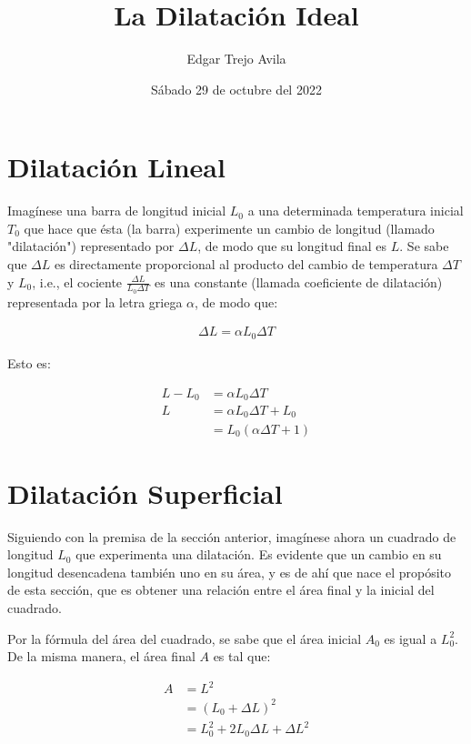 \documentclass{article}
\title{La Dilatación Ideal}
\author{Edgar Trejo Avila}
\date{Sábado 29 de octubre del 2022}
\begin{document}
\maketitle

\section*{Dilatación Lineal}

Imagínese una barra de longitud inicial \(L_0\)
a una determinada temperatura inicial \(T_0\) que
hace que ésta (la barra) experimente un cambio de 
longitud (llamado "dilatación") representado por 
\(\Delta L\), de modo que su longitud final es \(L\).
Se sabe que \(\Delta L\) es directamente proporcional
al producto del cambio de temperatura \(\Delta T\) y 
\(L_0\), i.e., el cociente \(\frac{\Delta L}{L_0 \Delta T}\)
es una constante (llamada coeficiente de dilatación)
representada por la letra griega \(\alpha\), de modo que:

\begin{align}
    \Delta L = \alpha L_0 \Delta T \label{linearDilatation}
\end{align}

Esto es:

\begin{align*}
    L - L_0 &= \alpha L_0 \Delta T \\
    L       &= \alpha L_0 \Delta T + L_0 \\
            &= L_0 \left( \alpha \Delta T + 1 \right) 
\end{align*}

\section*{Dilatación Superficial}

Siguiendo con la premisa de la sección anterior, imagínese 
ahora un cuadrado de longitud \(L_0\) que experimenta una
dilatación. Es evidente que un cambio en su longitud desencadena
también uno en su área, y es de ahí que nace el propósito de 
esta sección, que es obtener una relación entre el área final 
y la inicial del cuadrado. 

Por la fórmula del área del cuadrado, se sabe que el área 
inicial \(A_0\) es igual a \(L_0^2\). De la misma manera,
el área final \(A\) es tal que:

\begin{align*}
    A   &= L^2 \\
        &= \left( L_0 + \Delta L \right)^2 \\
        &= L_0^2 + 2 L_0 \Delta L + \Delta L^2 \\
\end{align*}
\end{document}
